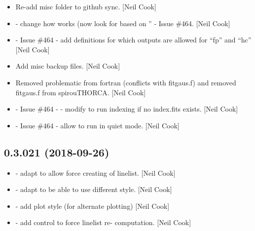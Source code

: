 \documentclass[a4paper,10pt,english]{report}
\begin{document}
\begin{itemize}
\item {} 
Re-add misc folder to github sync. {[}Neil Cook{]}

\item {} 
 - change how  works (now look for
 based on ” - Issue \#464. {[}Neil
Cook{]}

\item {} 
 - Issue \#464 - add definitions for which
outputs are allowed for “fp” and “hc” {[}Neil Cook{]}

\item {} 
Add misc backup files. {[}Neil Cook{]}

\item {} 
Removed problematic  from fortran (conflicts with fitgaus.f)
and removed fitgaus.f from spirouTHORCA. {[}Neil Cook{]}

\item {} 
 - Issue \#464 -  - modify to run
indexing if no index.fits exists. {[}Neil Cook{]}

\item {} 
 - Issue \#464 - allow  to run in
quiet mode. {[}Neil Cook{]}

\end{itemize}


\subsection{0.3.021 (2018-09-26)}
\label{\detokenize{misc/changelog:id311}}\begin{itemize}
\item {} 
 - adapt to allow force creating of linelist. {[}Neil Cook{]}

\item {} 
 - adapt to be able to use different style. {[}Neil Cook{]}

\item {} 
 - add plot style (for alternate plotting) {[}Neil Cook{]}

\item {} 
 - add control to force linelist re-
computation. {[}Neil Cook{]}

\end{itemize}
\end{document}
